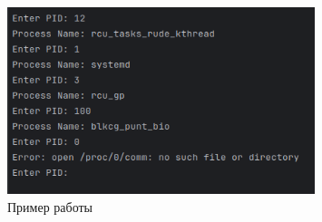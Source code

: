 \documentclass[a4paper, 14pt]{extarticle}
\begin{document}
\newpage

\begin{figure}[!htb]
	\centering
	\includegraphics[width=0.8\textwidth]{res.png}
\caption{Пример работы}
\label{fig:img1}
\end{figure}
\end{document}
